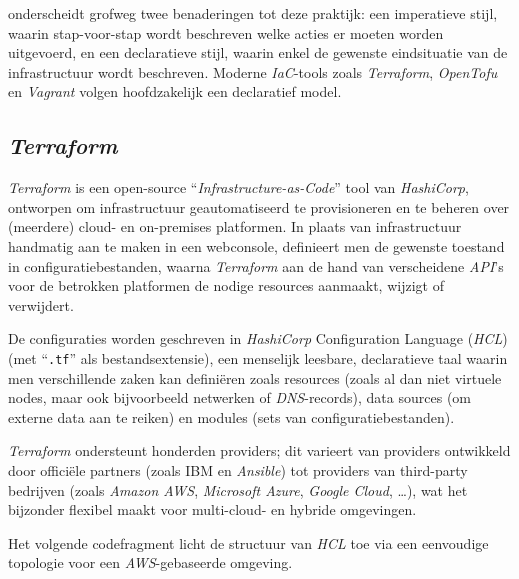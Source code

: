 \textcite{Baer2025} onderscheidt grofweg twee benaderingen tot deze praktijk: een imperatieve stijl, waarin stap-voor-stap wordt beschreven welke acties er moeten worden uitgevoerd, en een declaratieve stijl, waarin enkel de gewenste eindsituatie van de infrastructuur wordt beschreven.
Moderne \emph{IaC}-tools zoals \emph{Terraform}, \emph{OpenTofu} en \emph{Vagrant} volgen hoofdzakelijk een declaratief model.

\subsection{\emph{Terraform}}%

\emph{Terraform} is een open-source ``\emph{Infrastructure-as-Code}'' tool van \emph{HashiCorp}, ontworpen om infrastructuur geautomatiseerd te provisioneren en te beheren over (meerdere) cloud- en on-premises platformen.
In plaats van infrastructuur handmatig aan te maken in een webconsole, definieert men de gewenste toestand in configuratiebestanden, waarna \emph{Terraform} aan de hand van verscheidene \emph{API}'s voor de betrokken platformen de nodige resources aanmaakt, wijzigt of verwijdert. \autocite{HashiCorp2024}

De configuraties worden geschreven in \emph{HashiCorp} Configuration Language (\emph{HCL}) (met ``\texttt{.tf}'' als bestandsextensie), een menselijk leesbare, declaratieve taal waarin men verschillende zaken kan definiëren zoals resources (zoals al dan niet virtuele nodes, maar ook bijvoorbeeld netwerken of \emph{DNS}-records), data sources (om externe data aan te reiken) en modules (sets van configuratiebestanden). \autocite{HashiCorp2025}

\emph{Terraform} ondersteunt honderden providers; dit varieert van providers ontwikkeld door officiële partners (zoals IBM en \emph{Ansible}) tot providers van third-party bedrijven (zoals \emph{Amazon AWS}, \emph{Microsoft Azure}, \emph{Google Cloud}, \ldots), wat het bijzonder flexibel maakt voor multi-cloud- en hybride omgevingen. \autocite{HashiCorp2025a}

Het volgende codefragment licht de structuur van \emph{HCL} toe via een eenvoudige topologie voor een \emph{AWS}-gebaseerde omgeving.

